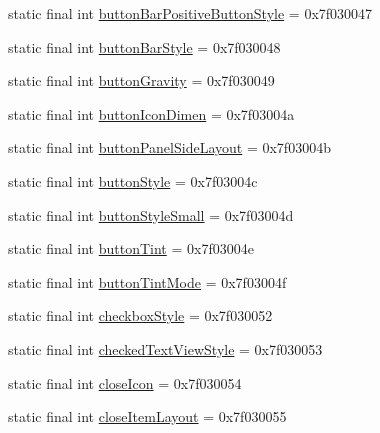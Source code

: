 \begin{DoxyCompactItemize}
\item 
static final int \mbox{\hyperlink{classandroid_1_1support_1_1v7_1_1appcompat_1_1_r_1_1attr_a26cd7b024644bde342832500dee80fd4}{button\+Bar\+Positive\+Button\+Style}} = 0x7f030047
\item 
static final int \mbox{\hyperlink{classandroid_1_1support_1_1v7_1_1appcompat_1_1_r_1_1attr_ae1d3830a3bd9657ba6612489fa0472da}{button\+Bar\+Style}} = 0x7f030048
\item 
static final int \mbox{\hyperlink{classandroid_1_1support_1_1v7_1_1appcompat_1_1_r_1_1attr_ac46d4436bacc662abc978739c43817a8}{button\+Gravity}} = 0x7f030049
\item 
static final int \mbox{\hyperlink{classandroid_1_1support_1_1v7_1_1appcompat_1_1_r_1_1attr_ad5aec414b8fae7a57ad44daa2851ba8c}{button\+Icon\+Dimen}} = 0x7f03004a
\item 
static final int \mbox{\hyperlink{classandroid_1_1support_1_1v7_1_1appcompat_1_1_r_1_1attr_a658402b828e18d0af90a63eb4216a609}{button\+Panel\+Side\+Layout}} = 0x7f03004b
\item 
static final int \mbox{\hyperlink{classandroid_1_1support_1_1v7_1_1appcompat_1_1_r_1_1attr_ac1aeb27497dca91db3ac44616d3f94e2}{button\+Style}} = 0x7f03004c
\item 
static final int \mbox{\hyperlink{classandroid_1_1support_1_1v7_1_1appcompat_1_1_r_1_1attr_a7f18133bc54befe178c708e27b8cf88a}{button\+Style\+Small}} = 0x7f03004d
\item 
static final int \mbox{\hyperlink{classandroid_1_1support_1_1v7_1_1appcompat_1_1_r_1_1attr_aeb07ad1e687cb0f37520e237cd212f87}{button\+Tint}} = 0x7f03004e
\item 
static final int \mbox{\hyperlink{classandroid_1_1support_1_1v7_1_1appcompat_1_1_r_1_1attr_ab1671f07575b937859e3b00a452dd65a}{button\+Tint\+Mode}} = 0x7f03004f
\item 
static final int \mbox{\hyperlink{classandroid_1_1support_1_1v7_1_1appcompat_1_1_r_1_1attr_aff66bca5655717563e1cbd26eb6e1d9b}{checkbox\+Style}} = 0x7f030052
\item 
static final int \mbox{\hyperlink{classandroid_1_1support_1_1v7_1_1appcompat_1_1_r_1_1attr_a6335909bf985d3026fa7fc82c5947223}{checked\+Text\+View\+Style}} = 0x7f030053
\item 
static final int \mbox{\hyperlink{classandroid_1_1support_1_1v7_1_1appcompat_1_1_r_1_1attr_a418afef4769ee5513b3e569a5969e3bb}{close\+Icon}} = 0x7f030054
\item 
static final int \mbox{\hyperlink{classandroid_1_1support_1_1v7_1_1appcompat_1_1_r_1_1attr_a2306aa8d26074c7e03bbb2a1de1d5e77}{close\+Item\+Layout}} = 0x7f030055

\end{DoxyCompactItemize}
